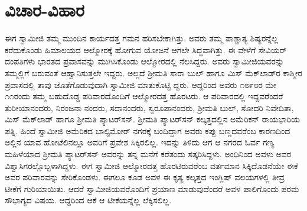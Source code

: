 
\chapter{ವಿಚಾರ-ವಿಹಾರ}

\noindent

ಈಗ ಸ್ವಾಮೀಜಿ ತಮ್ಮ ಮುಂದಿನ ಕಾರ್ಯದತ್ತ ಗಮನ ಹರಿಸಬೇಕಾಗಿತ್ತು. ಅವರು ತಮ್ಮ ಪಾಶ್ಚಾತ್ಯ ಶಿಷ್ಯರನ್ನೆಲ್ಲ ಕರೆದುಕೊಂಡು ಹಿಮಾಲಯದ ಆಲ್ಮೋರಕ್ಕೆ ಹೋಗುವ ಯೋಜನೆ ಆಗಲೇ ಸಿದ್ಧವಾಗಿತ್ತು. ಈ ವೇಳೆಗೆ ಸೇವಿಯರ್ ದಂಪತಿಗಳು ಭಾರತದ ಪ್ರವಾಸವನ್ನು ಮುಗಿಸಿಕೊಂಡು ಆಲ್ಮೋರದಲ್ಲಿ ನೆಲಸಿದ್ದರು. ಅವರು ಸ್ವಾಮೀಜಿಯವರನ್ನು ತಮ್ಮಲ್ಲಿಗೆ ಬರುವಂತೆ ಆಹ್ವಾನಿಸುತ್ತಲೇ ಇದ್ದರು. ಅಲ್ಲದೆ ಶ್ರೀಮತಿ ಸಾರಾ ಬುಲ್ ಹಾಗೂ ಮಿಸ್ ಮೆಕ್​ಲಾಡ್​ರ ಕಾಶ್ಮೀರ ಪ್ರವಾಸದಲ್ಲಿ ತಾವು ಜೊತೆಗೊಡುವುದಾಗಿ ಸ್ವಾಮೀಜಿ ಮಾತುಕೊಟ್ಟಿ ದ್ದರು. ಆದ್ದರಿಂದ ಅವರು ೧೮೯೮ರ ಮೇ ೧೧ರಂದು ತಮ್ಮ ಬಹುದೊಡ್ಡ ಪರಿವಾರದೊಂದಿಗೆ ಆಲ್ಮೋರದತ್ತ ಹೊರಟರು. ಆ ಪರಿವಾರದಲ್ಲಿ ಇದ್ದವರೆಂದರೆ ತುರೀಯಾನಂದರು, ನಿರಂಜನಾ ನಂದರು, ಸದಾನಂದರು, ಸ್ವರೂಪಾನಂದರು, ಶ್ರೀಮತಿ ಬುಲ್, ಸೋದರಿ ನಿವೇದಿತಾ, ಮಿಸ್ ಮೆಕ್​ಲಾಡ್ ಹಾಗೂ ಶ್ರೀಮತಿ ಪ್ಯಾಟರ್​ಸನ್. ಶ್ರೀಮತಿ ಪ್ಯಾಟರ್​ಸನ್ ಕಲ್ಕತ್ತದಲ್ಲಿನ ಅಮೆರಿಕನ್ ರಾಯಭಾರಿಯ ಪತ್ನಿ. ಹಿಂದೆ ಸ್ವಾಮೀಜಿ ಅಮೆರಿಕದ ಬಾಲ್ಟಿಮೋರ್ ನಗರಕ್ಕೆ ಬಂದಿದ್ದಾಗ ಅವರು ಕಪ್ಪು ಬಣ್ಣದವರೆಂಬ ಕಾರಣದಿಂದ ಅಲ್ಲಿನ ಯಾವ ಹೋಟೆಲಿನಲ್ಲೂ ಅವರಿಗೆ ಪ್ರವೇಶ ಸಿಕ್ಕಿರಲಿಲ್ಲ. ಇದನ್ನು ತಿಳಿದು ಆಗ ಆ ನಗರದ ಓರ್ವ ಗಣ್ಯ ಮಹಿಳೆಯಾದ ಶ್ರೀಮತಿ ಪ್ಯಾಟರ್​ಸನ್ ಅವರನ್ನು ತನ್ನ ಮನೆಗೆ ಕರೆತಂದು ಸತ್ಕರಿಸಿದ್ದಳು. ಅಂದಿನಿಂದ ಅವಳು ಅವರ ವಿಶ್ವಾಸಿಗರಲ್ಲೊಬ್ಬಳಾಗಿದ್ದಳು. ಈಗ ಸ್ವಾಮೀಜಿ ಆಲ್ಮೋರದತ್ತ ಹೊರಟಿರುವರೆಂಬ ವರ್ತಮಾನ ಸಿಕ್ಕಿದೊಡನೆಯೇ ಈಕೆ ಅವರ ಪರಿವಾರವನ್ನು ಸೇರಿಕೊಂಡಳು. ಈಗಲೂ ಕೂಡ ಅವಳ ಈ ಕೃತ್ಯ ಕಲ್ಕತ್ತದ ಇಂಗ್ಲಿಷ್ ವಲಯಗಳಲ್ಲಿ ತೀವ್ರ ಟೀಕೆಗೆ ಗುರಿಯಾಯಿತು. ಆದರೆ ಸ್ವಾಮೀಜಿಯವರೊಂದಿಗೆ ಪ್ರಯಾಣ ಮಾಡುವುದೆಂದರೆ ಅವಳ ಪಾಲಿಗೊಂದು ಪರಮ ಸೌಭಾಗ್ಯದ ವಿಷಯ. ಆದ್ದರಿಂದ ಆಕೆ ಆ ಟೀಕೆಯನ್ನೆಲ್ಲ ಲೆಕ್ಕಿಸಲಿಲ್ಲ.

